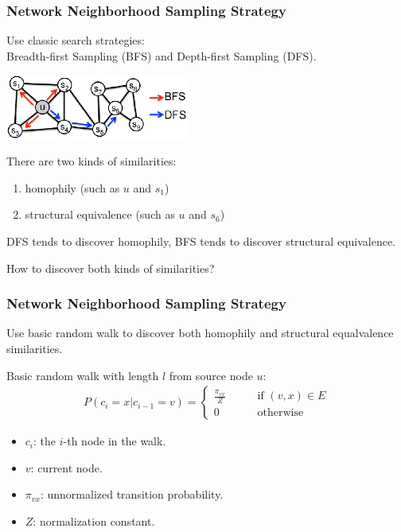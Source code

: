 \documentclass[10pt, aspectratio=169]{beamer}
\begin{document}
\begin{frame}
    \frametitle{Network Neighborhood Sampling Strategy}
    Use classic search strategies:\\
    Breadth-first Sampling (BFS) and Depth-first Sampling (DFS).
    \begin{center}
        \includegraphics[width=6cm]{./graphics/BFS_DFS.png}
    \end{center}
    There are two kinds of similarities:
    \begin{enumerate}
        \item homophily (such as $u$ and $s_1$)
        \item structural equivalence (such as $u$ and $s_6$)
    \end{enumerate}
    \par \vspace{0.2cm}
    DFS tends to discover homophily, BFS tends to discover structural equivalence.\par \vspace{0.2cm}
    How to discover both kinds of similarities?
\end{frame}

\begin{frame}
    \frametitle{Network Neighborhood Sampling Strategy}
    Use basic random walk to discover both homophily and structural equalvalence similarities.\par \vspace{0.2cm}
    Basic random walk with length $l$ from source node $u$:
    \begin{align*}
        P\left( c_i=x|c_{i-1}=v \right) =
        \begin{cases}
            \frac{\pi_{vx}}{Z}\qquad & \text{if } \left( v, x \right) \in E\\
            0\qquad & \text{otherwise}
        \end{cases}
    \end{align*}
    \begin{itemize}
        \item[] $c_i$: the $i$-th node in the walk.
        \item[] $v$: current node.
        \item[] $\pi_{vx}$: unnormalized transition probability.
        \item[] $Z$: normalization constant.
    \end{itemize}
\end{frame}
\end{document}
